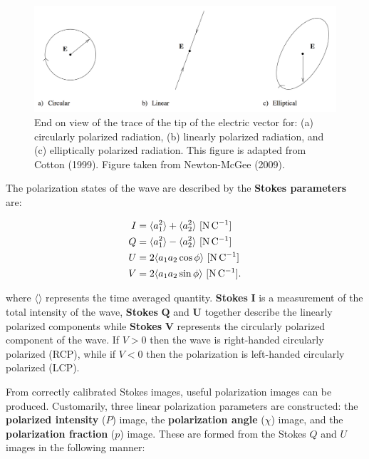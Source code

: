 \documentclass[a4paper,10pt]{article}
\begin{document}
\begin{figure}[t]
    \centering
    \includegraphics[width=12cm]{figures/PolarizationTypes.png}
    \caption{\footnotesize{End on view of the trace of the tip of the electric vector for: (a) circularly polarized radiation, (b) linearly polarized radiation, and (c) elliptically polarized radiation. This figure is adapted from Cotton (1999). Figure taken from Newton-McGee (2009).}}
    \label{fig:polarizationtypes}
\end{figure}

{\noindent}The polarization states of the wave are described by the \textbf{Stokes parameters} are:

\begin{align*}
    I &= \langle{a_1^2}\rangle + \langle{a_2^2}\rangle ~ [{\rm N\,C^{-1}}] \\
    Q &= \langle{a_1^2}\rangle - \langle{a_2^2}\rangle ~ [{\rm N\,C^{-1}}] \\
    U &= 2\langle{a_1a_2\cos\phi}\rangle ~ [{\rm N\,C^{-1}}] \\
    V &= 2\langle{a_1a_2\sin\phi}\rangle ~ [{\rm N\,C^{-1}}].
\end{align*}

{\noindent}where $\langle\rangle$ represents the time averaged quantity. \textbf{Stokes} $\mathbf{I}$ is a measurement of the total intensity of the wave, \textbf{Stokes} $\mathbf{Q}$ and $\mathbf{U}$ together describe the linearly polarized components while \textbf{Stokes} $\mathbf{V}$ represents the circularly polarized component of the wave. If $V>0$ then the wave is right-handed circularly polarized (RCP), while if $V<0$ then the polarization is left-handed circularly polarized (LCP). 

{\noindent}From correctly calibrated Stokes images, useful polarization images can be produced. Customarily, three linear polarization parameters are constructed: the \textbf{polarized intensity} ($P$) image, the \textbf{polarization angle} ($\chi$) image, and the \textbf{polarization fraction} ($p$) image. These are formed from the Stokes $Q$ and $U$ images in the following manner:
\end{document}
